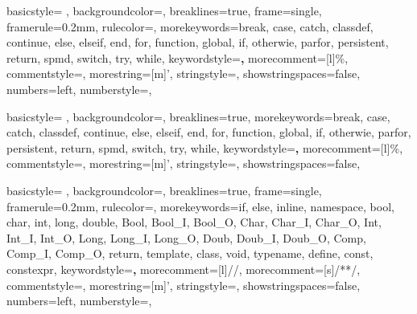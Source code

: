 {
    basicstyle= \ttfamily{}, %
    backgroundcolor=\color{background}, %
    breaklines=true, %
    frame=single,
    framerule=0.2mm, %
    rulecolor=\color{gray}, %
    morekeywords={break, case, catch, classdef, continue, else, elseif, end, for, function, global, if, otherwie, parfor, persistent, return, spmd, switch, try, while},
    keywordstyle=\color{blue}\textbf,
    morecomment=[l]{\%},
    commentstyle=\color{comment},
    morestring=[m]',
    stringstyle=\color{string},
    showstringspaces=false,
    numbers=left,
    numberstyle={\ttfamily{}\color{gray}}, %
}

{
    basicstyle= \ttfamily{}, %
    backgroundcolor=\color{background}, %
    breaklines=true, %
    morekeywords={break, case, catch, classdef, continue, else, elseif, end, for, function, global, if, otherwie, parfor, persistent, return, spmd, switch, try, while},
    keywordstyle=\color{blue}\textbf,
    morecomment=[l]{\%},
    commentstyle=\color{comment},
    morestring=[m]',
    stringstyle=\color{string},
    showstringspaces=false,
}

{
    basicstyle= \ttfamily{}, %
    backgroundcolor=\color{background}, %
    breaklines=true, %
    frame=single,
    framerule=0.2mm, %
    rulecolor=\color{gray}, %
    morekeywords={if, else, inline, namespace, bool, char, int, long, double, Bool, Bool_I, Bool_O, Char, Char_I, Char_O, Int, Int_I, Int_O, Long, Long_I, Long_O, Doub, Doub_I, Doub_O, Comp, Comp_I, Comp_O, return, template, class, void, typename, define, const, constexpr},
    keywordstyle=\color{blue}\textbf,
    morecomment=[l]{//},
    morecomment=[s]{/*}{*/},
    commentstyle=\color{comment},
    morestring=[m]',
    stringstyle=\color{string},
    showstringspaces=false,
    numbers=left,
    numberstyle={\ttfamily{}\color{gray}}, %
}

